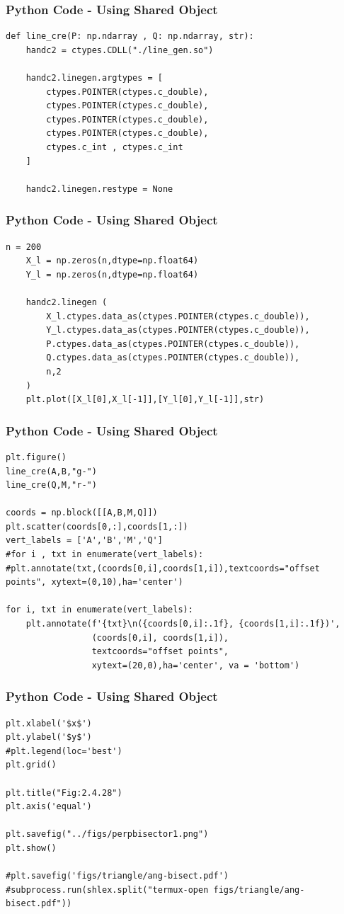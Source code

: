 \documentclass{beamer}
\begin{document}
\begin{frame}[fragile]
    \frametitle{Python Code - Using Shared Object}
    \begin{lstlisting}
def line_cre(P: np.ndarray , Q: np.ndarray, str):
    handc2 = ctypes.CDLL("./line_gen.so")

    handc2.linegen.argtypes = [
        ctypes.POINTER(ctypes.c_double),
        ctypes.POINTER(ctypes.c_double),
        ctypes.POINTER(ctypes.c_double),
        ctypes.POINTER(ctypes.c_double),
        ctypes.c_int , ctypes.c_int
    ]

    handc2.linegen.restype = None
\end{lstlisting}
\end{frame}
\begin{frame}[fragile]
    \frametitle{Python Code - Using Shared Object}
    \begin{lstlisting}
n = 200
    X_l = np.zeros(n,dtype=np.float64)
    Y_l = np.zeros(n,dtype=np.float64)

    handc2.linegen (
        X_l.ctypes.data_as(ctypes.POINTER(ctypes.c_double)),
        Y_l.ctypes.data_as(ctypes.POINTER(ctypes.c_double)),
        P.ctypes.data_as(ctypes.POINTER(ctypes.c_double)),
        Q.ctypes.data_as(ctypes.POINTER(ctypes.c_double)),
        n,2
    )
    plt.plot([X_l[0],X_l[-1]],[Y_l[0],Y_l[-1]],str)
    \end{lstlisting}
\end{frame}

\begin{frame}[fragile]
    \frametitle{Python Code - Using Shared Object}
    \begin{lstlisting}
plt.figure()
line_cre(A,B,"g-")
line_cre(Q,M,"r-")

coords = np.block([[A,B,M,Q]])
plt.scatter(coords[0,:],coords[1,:])
vert_labels = ['A','B','M','Q']
#for i , txt in enumerate(vert_labels):
#plt.annotate(txt,(coords[0,i],coords[1,i]),textcoords="offset points", xytext=(0,10),ha='center')

for i, txt in enumerate(vert_labels):
    plt.annotate(f'{txt}\n({coords[0,i]:.1f}, {coords[1,i]:.1f})',
                 (coords[0,i], coords[1,i]),
                 textcoords="offset points",
                 xytext=(20,0),ha='center', va = 'bottom')

\end{lstlisting}
\end{frame}

\begin{frame}[fragile]
    \frametitle{Python Code - Using Shared Object}
    \begin{lstlisting}
plt.xlabel('$x$')
plt.ylabel('$y$')
#plt.legend(loc='best')
plt.grid()

plt.title("Fig:2.4.28")
plt.axis('equal')

plt.savefig("../figs/perpbisector1.png")
plt.show()

#plt.savefig('figs/triangle/ang-bisect.pdf')
#subprocess.run(shlex.split("termux-open figs/triangle/ang-bisect.pdf"))

\end{lstlisting}
\end{frame}
\end{document}
